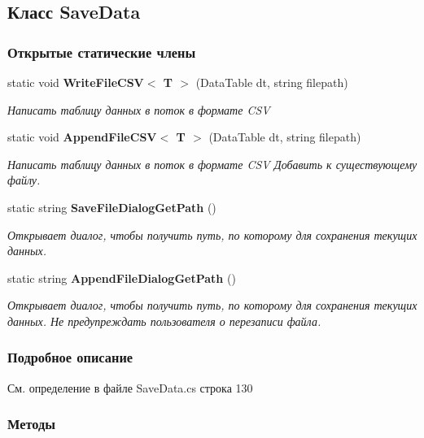 \subsection{Класс Save\+Data}
\label{classkdz__manager_1_1_save_data}
\subsubsection*{Открытые статические члены}
\begin{DoxyCompactItemize}
\item 
static void {\bf Write\+File\+C\+S\+V$<$ T $>$} (Data\+Table dt, string filepath)
\begin{DoxyCompactList}\small\item\em Написать таблицу данных в поток в формате C\+S\+V \end{DoxyCompactList}\item 
static void {\bf Append\+File\+C\+S\+V$<$ T $>$} (Data\+Table dt, string filepath)
\begin{DoxyCompactList}\small\item\em Написать таблицу данных в поток в формате C\+S\+V Добавить к существующему файлу. \end{DoxyCompactList}\item 
static string {\bf Save\+File\+Dialog\+Get\+Path} ()
\begin{DoxyCompactList}\small\item\em Открывает диалог, чтобы получить путь, по которому для сохранения текущих данных. \end{DoxyCompactList}\item 
static string {\bf Append\+File\+Dialog\+Get\+Path} ()
\begin{DoxyCompactList}\small\item\em Открывает диалог, чтобы получить путь, по которому для сохранения текущих данных. Не предупреждать пользователя о перезаписи файла. \end{DoxyCompactList}\end{DoxyCompactItemize}


\subsubsection{Подробное описание}


См. определение в файле Save\+Data.\+cs строка 130



\subsubsection{Методы}
